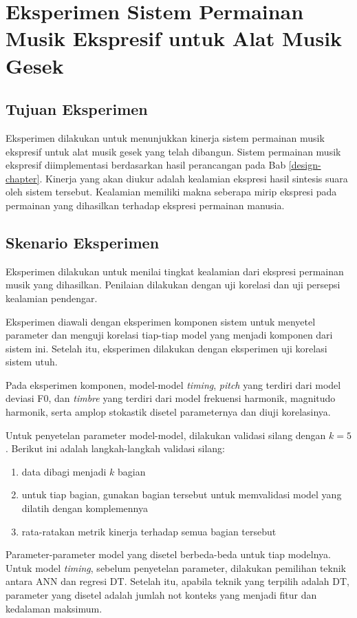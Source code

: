 \chapter{Eksperimen Sistem Permainan Musik Ekspresif untuk Alat Musik Gesek}

\section{Tujuan Eksperimen}
Eksperimen dilakukan untuk menunjukkan kinerja sistem permainan musik ekspresif untuk alat musik gesek yang telah dibangun. Sistem permainan musik ekspresif diimplementasi berdasarkan hasil perancangan pada Bab \ref{design-chapter}. Kinerja yang akan diukur adalah kealamian ekspresi hasil sintesis suara oleh sistem tersebut. Kealamian memiliki makna seberapa mirip ekspresi pada permainan yang dihasilkan terhadap ekspresi permainan manusia.

\section{Skenario Eksperimen}
Eksperimen dilakukan untuk menilai tingkat kealamian dari ekspresi permainan musik yang dihasilkan. Penilaian dilakukan dengan uji korelasi dan uji persepsi kealamian pendengar.

Eksperimen diawali dengan eksperimen komponen sistem untuk menyetel parameter dan menguji korelasi tiap-tiap model yang menjadi komponen dari sistem ini. Setelah itu, eksperimen dilakukan dengan eksperimen uji korelasi sistem utuh.

Pada eksperimen komponen, model-model \textit{timing}, \textit{pitch} yang terdiri dari model deviasi F0, dan \textit{timbre} yang terdiri dari model frekuensi harmonik, magnitudo harmonik, serta amplop stokastik disetel parameternya dan diuji korelasinya.

Untuk penyetelan parameter model-model, dilakukan validasi silang dengan $k=5$. Berikut ini adalah langkah-langkah validasi silang:
\begin{enumerate}
	\item data dibagi menjadi $k$ bagian
	\item untuk tiap bagian, gunakan bagian tersebut untuk memvalidasi model yang dilatih dengan komplemennya
	\item rata-ratakan metrik kinerja terhadap semua bagian tersebut
\end{enumerate}

Parameter-parameter model yang disetel berbeda-beda untuk tiap modelnya. Untuk model \textit{timing}, sebelum penyetelan parameter, dilakukan pemilihan teknik antara ANN dan regresi DT. Setelah itu, apabila teknik yang terpilih adalah DT, parameter yang disetel adalah jumlah not konteks yang menjadi fitur dan kedalaman maksimum.

